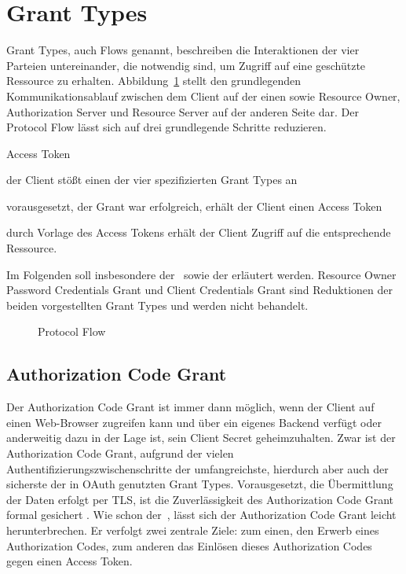 \section{\glspl{Grant Type}}\label{GrantTypes} \glspl{Grant Type}, auch Flows
genannt, beschreiben die Interaktionen der vier Parteien untereinander, die
notwendig sind, um Zugriff auf eine geschützte Ressource zu erhalten.
Abbildung~\ref{fig: Protocol Flow} stellt den grundlegenden Kommunikationsablauf
zwischen dem Client auf der einen sowie Resource Owner, Authorization Server und
Resource Server auf der anderen Seite dar. Der Protocol Flow lässt sich auf drei
grundlegende Schritte reduzieren.


\begin{labeling}{Access Token}
    \item [Authorization Grant] der Client stößt einen der vier spezifizierten
    \glspl{Grant Type} an
    \item [Access Token Retrieval] vorausgesetzt, der Grant war erfolgreich,
    erhält der Client einen Access Token
    \item [Resource Access] durch Vorlage des Access Tokens erhält der Client
    Zugriff auf die entsprechende Ressource.
\end{labeling} Im Folgenden soll insbesondere der~ sowie
der  erläutert werden. Resource Owner Password
Credentials Grant und Client Credentials Grant sind Reduktionen der beiden
vorgestellten \glspl{Grant Type} und werden nicht behandelt.

\begin{figure}[h]
    \scalebox{.6} {
        
    }
    \caption{Protocol Flow}\label{fig: Protocol Flow}
\end{figure} 

\subsection{Authorization Code Grant}\label{ssec:authcode}  Der Authorization Code Grant ist immer dann möglich, wenn der
Client auf einen Web-Browser zugreifen kann und über ein eigenes Backend verfügt
oder anderweitig dazu in der Lage ist, sein Client Secret  geheimzuhalten. Zwar
ist der Authorization Code Grant, aufgrund der vielen
Authentifizierungszwischenschritte der umfangreichste, hierdurch aber auch der
sicherste der in \gls{OAuth} genutzten \glspl{Grant Type}. Vorausgesetzt, die
Übermittlung der Daten erfolgt per \gls{TLS}, ist die Zuverlässigkeit des
Authorization Code Grant formal gesichert \cite{Chari.2011}. Wie schon
der~, lässt sich der Authorization Code Grant leicht
herunterbrechen. Er verfolgt zwei zentrale Ziele: zum einen, den Erwerb eines
Authorization Codes, zum anderen das Einlösen dieses Authorization Codes gegen
einen Access Token.

